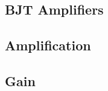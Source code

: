 \subsection{BJT Amplifiers}\label{subsec:BJT_Amps}

\subsection{Amplification}\label{subsec:Amplification}

\subsection{Gain}\label{subsec:Gain}

